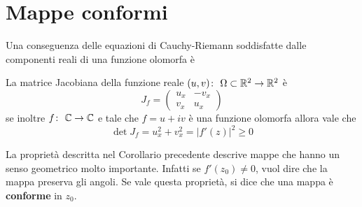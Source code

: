 \chapter{Mappe conformi}

Una conseguenza delle equazioni di Cauchy-Riemann soddisfatte dalle componenti
reali di una funzione olomorfa è 

\begin{corollary}
  La matrice Jacobiana della funzione reale $(u,v) \colon\ \Omega \subset
  \mathbb{R}^2 \rightarrow \mathbb{R}^2$ è
  \begin{equation*}
    J_f = \left(\begin{array}{cc} 
        u_x & -v_x\\
        v_x & u_x
    \end{array}\right) 
  \end{equation*}
  se inoltre $f \colon\ \mathbb{C} \rightarrow \mathbb{C}$ e tale che $f = u + iv$ è una funzione
  olomorfa allora vale che
  \begin{equation*}
    \det J_f = u^2_x + v^2_x = |f'(z)|^2 \ge 0 
  \end{equation*}
\end{corollary}

\begin{remark}
  La proprietà descritta nel Corollario precedente descrive mappe che hanno un 
  senso geometrico molto importante. Infatti se $f'(z_0) \neq 0$, vuol dire che
  la mappa preserva gli angoli. Se vale questa proprietà, si dice che una mappa
  è \textbf{conforme} in $z_0$.
  \label{rmk:conforme_intuizione}
\end{remark}


